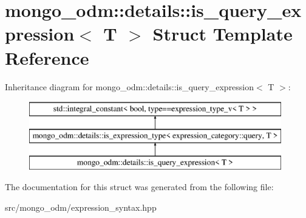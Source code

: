\hypertarget{structmongo__odm_1_1details_1_1is__query__expression}{}\section{mongo\+\_\+odm\+:\+:details\+:\+:is\+\_\+query\+\_\+expression$<$ T $>$ Struct Template Reference}
\label{structmongo__odm_1_1details_1_1is__query__expression}
Inheritance diagram for mongo\+\_\+odm\+:\+:details\+:\+:is\+\_\+query\+\_\+expression$<$ T $>$\+:\begin{figure}[H]
\begin{center}
\leavevmode
\includegraphics[height=3.000000cm]{structmongo__odm_1_1details_1_1is__query__expression}
\end{center}
\end{figure}


The documentation for this struct was generated from the following file\+:\begin{DoxyCompactItemize}
\item 
src/mongo\+\_\+odm/expression\+\_\+syntax.\+hpp\end{DoxyCompactItemize}
